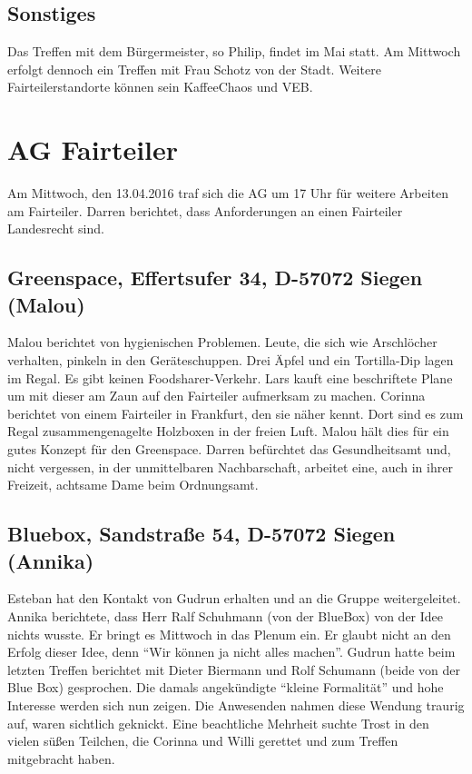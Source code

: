 \documentclass{scrreprt}
\begin{document}
{\subsection{Sonstiges}
Das Treffen mit dem Bürgermeister, so Philip, findet im Mai statt. Am Mittwoch erfolgt dennoch ein Treffen mit Frau Schotz von der Stadt. Weitere Fairteilerstandorte können sein KaffeeChaos und VEB. 

\section{AG Fairteiler}
Am Mittwoch, den 13.04.2016 traf sich die AG um 17 Uhr für weitere Arbeiten am Fairteiler. Darren berichtet, dass Anforderungen an einen Fairteiler Landesrecht sind.

\subsection{Greenspace, Effertsufer 34, D-57072 Siegen (Malou)}
Malou berichtet von hygienischen Problemen. Leute, die sich wie Arschlöcher verhalten, pinkeln in den Geräteschuppen. Drei Äpfel und ein Tortilla-Dip lagen im Regal. Es gibt keinen Foodsharer-Verkehr. Lars kauft eine beschriftete Plane um mit dieser am Zaun auf den Fairteiler aufmerksam zu machen. Corinna berichtet von einem Fairteiler in Frankfurt, den sie näher kennt. Dort sind es zum Regal zusammengenagelte Holzboxen in der freien Luft. Malou hält dies für ein gutes Konzept für den Greenspace. Darren befürchtet das Gesundheitsamt und, nicht vergessen, in der unmittelbaren Nachbarschaft, arbeitet eine, auch in ihrer Freizeit, achtsame Dame beim Ordnungsamt.

\subsection{Bluebox, Sandstraße 54, D-57072 Siegen (Annika)}
Esteban hat den Kontakt von Gudrun erhalten und an die Gruppe weitergeleitet. Annika berichtete, dass Herr Ralf Schuhmann (von der BlueBox) von der Idee nichts wusste. Er bringt es Mittwoch in das Plenum ein. Er glaubt nicht an den Erfolg dieser Idee, denn \enquote{Wir können ja nicht alles machen}. Gudrun hatte beim letzten Treffen berichtet mit Dieter Biermann und Rolf Schumann (beide von der Blue Box) gesprochen. Die damals angekündigte \enquote{kleine Formalität} und hohe Interesse werden sich nun zeigen. Die Anwesenden nahmen diese Wendung traurig auf, waren sichtlich geknickt. Eine beachtliche Mehrheit suchte Trost in den vielen süßen Teilchen, die Corinna und Willi gerettet und zum Treffen mitgebracht haben. 

}
\end{document}
